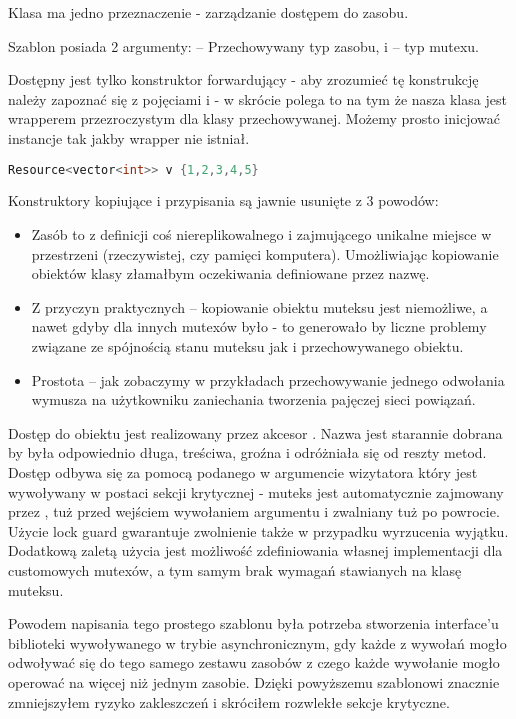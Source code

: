 
Klasa ma jedno przeznaczenie - zarządzanie dostępem do zasobu.

Szablon posiada 2 argumenty:  -- Przechowywany typ zasobu, i  -- typ mutexu.

Dostępny jest tylko konstruktor forwardujący - aby zrozumieć tę konstrukcję należy zapoznać się z pojęciami  i  - w skrócie polega to na tym że nasza klasa  jest wrapperem przezroczystym dla klasy przechowywanej. Możemy prosto inicjować instancje tak jakby wrapper  nie istniał.
\begin{lstlisting}[language=C++,style=cpp-style,aboveskip=1pt,belowskip=5pt]
  Resource<vector<int>> v {1,2,3,4,5}
\end{lstlisting}

Konstruktory kopiujące i przypisania są jawnie usunięte z 3 powodów:
\begin{itemize}
\item Zasób to z definicji coś niereplikowalnego i zajmującego unikalne miejsce w przestrzeni (rzeczywistej, czy pamięci komputera). Umożliwiając kopiowanie obiektów klasy  złamałbym oczekiwania definiowane przez nazwę.
\item Z przyczyn praktycznych -- kopiowanie obiektu muteksu jest niemożliwe, a nawet gdyby dla innych mutexów było - to generowało by liczne problemy związane ze spójnością stanu muteksu jak i przechowywanego obiektu.
\item Prostota -- jak zobaczymy w przykładach przechowywanie jednego odwołania wymusza na użytkowniku zaniechania tworzenia pajęczej sieci powiązań.
\end{itemize}

Dostęp do obiektu jest realizowany przez akcesor . Nazwa jest starannie dobrana by była odpowiednio długa, treściwa, groźna i odróżniała się od reszty metod. Dostęp odbywa się za pomocą podanego w argumencie wizytatora który jest wywoływany w postaci sekcji krytycznej - muteks jest automatycznie zajmowany przez , tuż przed wejściem wywołaniem argumentu i zwalniany tuż po powrocie. Użycie lock guard gwarantuje zwolnienie także w przypadku wyrzucenia wyjątku. Dodatkową zaletą użycia  jest możliwość zdefiniowania własnej implementacji dla customowych mutexów, a tym samym brak wymagań stawianych na klasę muteksu.

Powodem napisania tego prostego szablonu była potrzeba stworzenia interface'u biblioteki wywoływanego w trybie asynchronicznym, gdy każde z wywołań mogło odwoływać się do tego samego zestawu zasobów z czego każde wywołanie mogło operować na więcej niż jednym zasobie. Dzięki powyższemu szablonowi znacznie zmniejszyłem ryzyko zakleszczeń i skróciłem rozwlekłe sekcje krytyczne.
